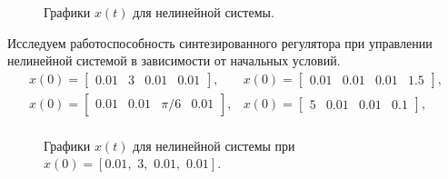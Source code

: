 \begin{figure}[!h]
	\caption{Графики $x(t)$ для нелинейной системы.}
	\label{6_lqr_1}
\end{figure}

Исследуем работоспособность синтезированного регулятора при управлении нелинейной системой в зависимости от начальных условий.
\begin{equation*}
	\begin{matrix}
		x(0) = \begin{bmatrix}
			0.01 & 3 & 0.01 & 0.01
		\end{bmatrix}, & x(0) = \begin{bmatrix}
			0.01 & 0.01 & 0.01 & 1.5
		\end{bmatrix},\\
		x(0) = \begin{bmatrix}
			0.01 & 0.01 & \pi /6 & 0.01
		\end{bmatrix}, & x(0) = \begin{bmatrix}
			5 & 0.01 & 0.01 & 0.1
		\end{bmatrix},\\ 
	\end{matrix}
\end{equation*}


\begin{figure}[!h]
	\caption{Графики $x(t)$ для нелинейной системы при $x(0)=[0.01, \, \, 3, \, \, 0.01, \, \, 0.01]$.}
	\label{6_lqr_n1}
\end{figure}



